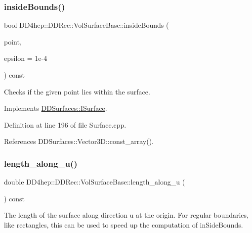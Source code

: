 \subsubsection{\texorpdfstring{inside\+Bounds()}{insideBounds()}}
{\footnotesize\ttfamily bool D\+D4hep\+::\+D\+D\+Rec\+::\+Vol\+Surface\+Base\+::inside\+Bounds (\begin{DoxyParamCaption}\item[{const \hyperlink{class_d_d_surfaces_1_1_vector3_d}{Vector3D} \&}]{point,  }\item[{double}]{epsilon = {\ttfamily 1e-\/4} }\end{DoxyParamCaption}) const\hspace{0.3cm}{\ttfamily [virtual]}}



Checks if the given point lies within the surface. 



Implements \hyperlink{class_d_d_surfaces_1_1_i_surface_a16aa78cb8c01cd5993b7cf23f55a7e3a}{D\+D\+Surfaces\+::\+I\+Surface}.



Definition at line 196 of file Surface.\+cpp.



References D\+D\+Surfaces\+::\+Vector3\+D\+::const\+\_\+array().

\hypertarget{class_d_d4hep_1_1_d_d_rec_1_1_vol_surface_base_aab10f0dd7b5c8e928177bec4caf337c1}{}\label{class_d_d4hep_1_1_d_d_rec_1_1_vol_surface_base_aab10f0dd7b5c8e928177bec4caf337c1} 
\subsubsection{\texorpdfstring{length\+\_\+along\+\_\+u()}{length\_along\_u()}}
{\footnotesize\ttfamily double D\+D4hep\+::\+D\+D\+Rec\+::\+Vol\+Surface\+Base\+::length\+\_\+along\+\_\+u (\begin{DoxyParamCaption}{ }\end{DoxyParamCaption}) const\hspace{0.3cm}{\ttfamily [virtual]}}

The length of the surface along direction u at the origin. For \textquotesingle{}regular\textquotesingle{} boundaries, like rectangles, this can be used to speed up the computation of in\+Side\+Bounds. 


